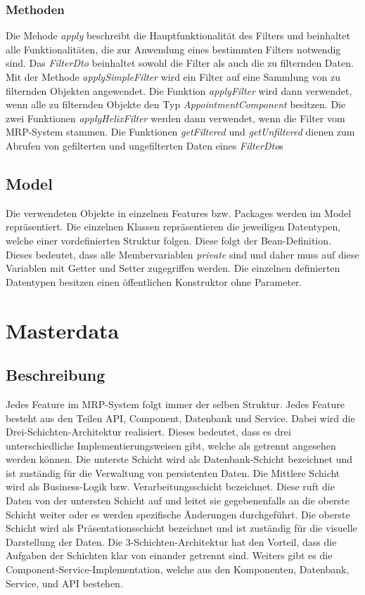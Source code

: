 \subsubsection{Methoden}
Die Mehode \textit{apply} beschreibt die Hauptfunktionalität des Filters und beinhaltet alle Funktionalitäten, die zur Anwendung eines bestimmten Filters notwendig sind. Das \textit{FilterDto} beinhaltet sowohl die Filter als auch die zu filternden Daten. Mit der Methode \textit{applySimpleFilter} wird ein Filter auf eine Sammlung von zu filternden Objekten angewendet. Die Funktion \textit{applyFilter} wird dann verwendet, wenn alle zu filternden Objekte den Typ \textit{AppointmentComponent} besitzen. Die zwei Funktionen \textit{applyHelixFilter} werden dann verwendet, wenn die Filter vom MRP-System stammen. Die Funktionen \textit{getFiltered} und \textit{getUnfiltered} dienen zum Abrufen von gefilterten und ungefilterten Daten eines \textit{FilterDto}s
\subsection{Model}
Die verwendeten Objekte in einzelnen Features bzw. Packages werden im Model repräsentiert. Die einzelnen Klassen repräsentieren die jeweiligen Datentypen, welche einer vordefinierten Struktur folgen. Diese folgt der Bean-Definition. Dieses bedeutet, dass alle Membervariablen \textit{private} sind und daher muss auf diese Variablen mit Getter und Setter zugegriffen werden. Die einzelnen definierten Datentypen besitzen einen öffentlichen Konstruktor ohne Parameter.
\section{Masterdata}
\subsection{Beschreibung}
Jedes Feature im MRP-System folgt immer der selben Struktur. Jedes Feature besteht aus den Teilen API, Component, Datenbank und Service. Dabei wird die Drei-Schichten-Architektur realisiert. Dieses bedeutet, dass es drei unterschiedliche Implementierungsweisen gibt, welche als getrennt angesehen werden können. Die unterste Schicht wird als Datenbank-Schicht bezeichnet und ist zuständig für die Verwaltung von persistenten Daten. Die Mittlere Schicht wird als Business-Logik bzw. Verarbeitungsschicht bezeichnet. Diese ruft die Daten von der untersten Schicht auf und leitet sie gegebenenfalls an die oberste Schicht weiter oder es werden spezifische Änderungen durchgeführt. Die oberste Schicht wird als Präsentationsschicht bezeichnet und ist zuständig für die visuelle Darstellung der Daten. Die 3-Schichten-Architektur hat den Vorteil, dass die Aufgaben der Schichten klar von einander getrennt sind. Weiters gibt es die Component-Service-Implementation, welche aus den Komponenten, Datenbank, Service, und API bestehen.
